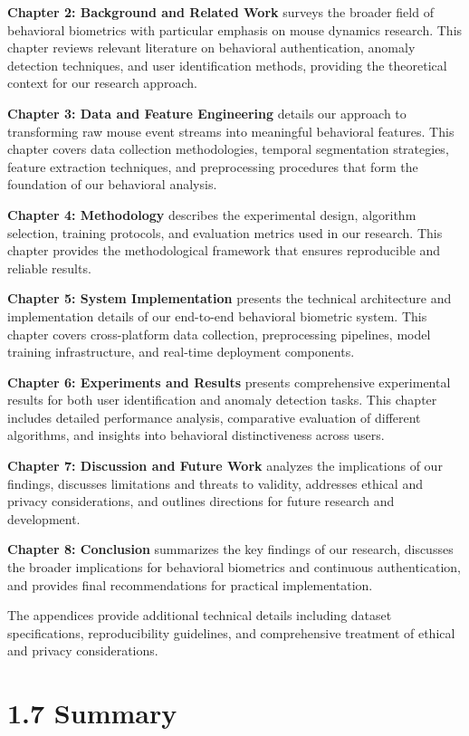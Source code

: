 \documentclass[
  12pt,
  a4paper,
]{report}
\begin{document}
\textbf{Chapter 2: Background and Related Work} surveys the broader
field of behavioral biometrics with particular emphasis on mouse
dynamics research. This chapter reviews relevant literature on
behavioral authentication, anomaly detection techniques, and user
identification methods, providing the theoretical context for our
research approach.

\textbf{Chapter 3: Data and Feature Engineering} details our approach to
transforming raw mouse event streams into meaningful behavioral
features. This chapter covers data collection methodologies, temporal
segmentation strategies, feature extraction techniques, and
preprocessing procedures that form the foundation of our behavioral
analysis.

\textbf{Chapter 4: Methodology} describes the experimental design,
algorithm selection, training protocols, and evaluation metrics used in
our research. This chapter provides the methodological framework that
ensures reproducible and reliable results.

\textbf{Chapter 5: System Implementation} presents the technical
architecture and implementation details of our end-to-end behavioral
biometric system. This chapter covers cross-platform data collection,
preprocessing pipelines, model training infrastructure, and real-time
deployment components.

\textbf{Chapter 6: Experiments and Results} presents comprehensive
experimental results for both user identification and anomaly detection
tasks. This chapter includes detailed performance analysis, comparative
evaluation of different algorithms, and insights into behavioral
distinctiveness across users.

\textbf{Chapter 7: Discussion and Future Work} analyzes the implications
of our findings, discusses limitations and threats to validity,
addresses ethical and privacy considerations, and outlines directions
for future research and development.

\textbf{Chapter 8: Conclusion} summarizes the key findings of our
research, discusses the broader implications for behavioral biometrics
and continuous authentication, and provides final recommendations for
practical implementation.

The appendices provide additional technical details including dataset
specifications, reproducibility guidelines, and comprehensive treatment
of ethical and privacy considerations.

\section{1.7 Summary}\label{summary}
\end{document}
